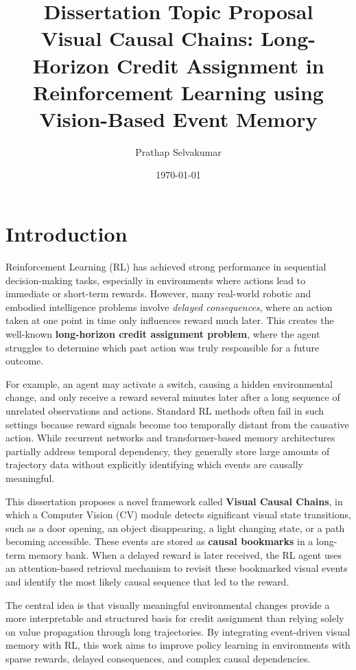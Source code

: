 \documentclass[12pt,a4paper]{article}
\title{\textbf{Dissertation Topic Proposal}\\[0.5em]
\large Visual Causal Chains: Long-Horizon Credit Assignment in Reinforcement Learning using Vision-Based Event Memory}
\author{Prathap Selvakumar}
\date{\today}
\begin{document}
\maketitle

\section{Introduction}

Reinforcement Learning (RL) has achieved strong performance in sequential decision-making tasks, especially in environments where actions lead to immediate or short-term rewards. However, many real-world robotic and embodied intelligence problems involve \textit{delayed consequences}, where an action taken at one point in time only influences reward much later. This creates the well-known \textbf{long-horizon credit assignment problem}, where the agent struggles to determine which past action was truly responsible for a future outcome.

For example, an agent may activate a switch, causing a hidden environmental change, and only receive a reward several minutes later after a long sequence of unrelated observations and actions. Standard RL methods often fail in such settings because reward signals become too temporally distant from the causative action. While recurrent networks and transformer-based memory architectures partially address temporal dependency, they generally store large amounts of trajectory data without explicitly identifying which events are causally meaningful.

This dissertation proposes a novel framework called \textbf{Visual Causal Chains}, in which a Computer Vision (CV) module detects significant visual state transitions, such as a door opening, an object disappearing, a light changing state, or a path becoming accessible. These events are stored as \textbf{causal bookmarks} in a long-term memory bank. When a delayed reward is later received, the RL agent uses an attention-based retrieval mechanism to revisit these bookmarked visual events and identify the most likely causal sequence that led to the reward.

The central idea is that visually meaningful environmental changes provide a more interpretable and structured basis for credit assignment than relying solely on value propagation through long trajectories. By integrating event-driven visual memory with RL, this work aims to improve policy learning in environments with sparse rewards, delayed consequences, and complex causal dependencies.
\end{document}
